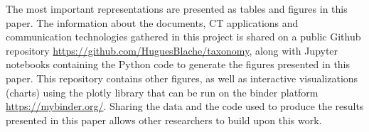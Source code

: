 
The most important representations are presented as tables and figures in this paper. The information about the documents, \acrshort{CT} applications and communication technologies gathered in this project is shared on a public Github repository \url{https://github.com/HuguesBlache/taxonomy}, along with Jupyter notebooks containing the Python code to generate the figures presented in this paper. This repository contains other figures, as well as interactive visualizations (charts) using the plotly library that can be run on the binder platform \url{https://mybinder.org/}. Sharing the data and the code used to produce the results presented in this paper allows other researchers to build upon this work. 




 

